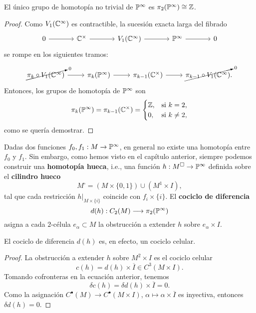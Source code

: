 \begin{proposition}
El único grupo de homotopía no trivial de $\P^\infty$ es $\pi_2(\P^\infty) \cong \Z$.
\end{proposition}

\begin{proof}
Como $V_1(\C^\infty)$ es contractible, la sucesión exacta larga del fibrado
$$
\begin{tikzcd}[row sep = large, column sep = large]
    0 \arrow[r] & \C^\times \arrow[r] & V_1(\C^\infty) \arrow[r] & \P^\infty \arrow[r] & 0
\end{tikzcd}
$$
se rompe en los siguientes tramos:
$$
\begin{tikzcd}
    \cancelto 0 {\pi_k \circ V_1(\C^\infty)} \arrow[r]
        & \pi_k(\P^\infty) \arrow[r]
        & \pi_{k-1}(\C^\times) \arrow[r]
        & \cancelto 0 {\pi_{k-1} \circ V_1(\C^\infty)}.
\end{tikzcd}
$$
Entonces, los grupos de homotopía de $\P^\infty$ son
$$
\pi_k(\P^\infty) = \pi_{k-1}(\C^\times) =
  \begin{cases}
    \Z, & \text{si } k  =  2, \\
    0,  & \text{si } k \ne 2,
  \end{cases}
$$
como se quería demostrar.
\end{proof}

Dadas dos funciones $f_0, f_1 : M \to \P^\infty$, en general no existe una homotopía entre $f_0$ y $f_1$. Sin embargo, como hemos visto en el capítulo anterior, siempre podemos construir una \textbf{homotopía hueca}, i.e., una función $h : M^\square \to \P^\infty$ definida sobre el \textbf{cilindro hueco}
$$M^\square = (M \times \{ 0, 1 \}) \cup (M^1 \times I),$$
tal que cada restricción $h \vert_{M \times \{ i \}}$ coincide con $f_i \times \{ i \}$. El \textbf{cociclo de diferencia}
$$d(h) : C_2(M) \longrightarrow \pi_2(\P^\infty)$$
asigna a cada $2$-célula $e_\alpha \subset M$ la obstrucción a extender $h$ sobre $e_\alpha \times I$.

\begin{proposition}
El cociclo de diferencia $d(h)$ es, en efecto, un cociclo celular.
\end{proposition}

\begin{proof}
La obstrucción a extender $h$ sobre $M^2 \times I$ es el cociclo celular
$$c(h) = d(h) \times \overline I \in C^3(M \times I).$$
Tomando cofronteras en la ecuación anterior, tenemos
$$\delta c(h) = \delta d(h) \times \overline I = 0.$$
Como la asignación $C^\bullet(M) \to C^\bullet(M \times I)$, $\alpha \mapsto \alpha \times \overline I$ es inyectiva, entonces $\delta d(h) = 0$.
\end{proof}


